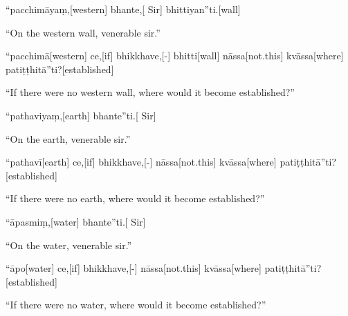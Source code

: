 \begin{samepage}
\begingl[glneveryline={\PaliGlossA,\PaliGlossB}]
“pacchimāyaṃ,[western] bhante,[ Sir] bhittiyan”ti.[wall]
\endgl
\nopagebreak
\linespread{0.5}
\begin{spacin}{0.2}
{\PaliGlossFT “On the western wall, venerable sir.”}
\end{spacin}
\vskip 12pt
\end{samepage}
\begin{samepage}
\begingl[glneveryline={\PaliGlossA,\PaliGlossB}]
“pacchimā[western] ce,[if] bhikkhave,[-] bhitti[wall] nāssa[not.this] kvāssa[where] patiṭṭhitā”ti?[established]
\endgl
\nopagebreak
\linespread{0.5}
\begin{spacin}{0.2}
{\PaliGlossFT “If there were no western wall, where would it become established?”}
\end{spacin}
\vskip 12pt
\end{samepage}
\begin{samepage}
\begingl[glneveryline={\PaliGlossA,\PaliGlossB}]
“pathaviyaṃ,[earth] bhante”ti.[ Sir]
\endgl
\nopagebreak
\linespread{0.5}
\begin{spacin}{0.2}
{\PaliGlossFT “On the earth, venerable sir.”}
\end{spacin}
\vskip 12pt
\end{samepage}
\begin{samepage}
\begingl[glneveryline={\PaliGlossA,\PaliGlossB}]
“pathavī[earth] ce,[if] bhikkhave,[-] nāssa[not.this] kvāssa[where] patiṭṭhitā”ti?[established]
\endgl
\nopagebreak
\linespread{0.5}
\begin{spacin}{0.2}
{\PaliGlossFT “If there were no earth, where would it become established?”}
\end{spacin}
\vskip 12pt
\end{samepage}
\begin{samepage}
\begingl[glneveryline={\PaliGlossA,\PaliGlossB}]
“āpasmiṃ,[water] bhante”ti.[ Sir]
\endgl
\nopagebreak
\linespread{0.5}
\begin{spacin}{0.2}
{\PaliGlossFT “On the water, venerable sir.”}
\end{spacin}
\vskip 12pt
\end{samepage}
\begin{samepage}
\begingl[glneveryline={\PaliGlossA,\PaliGlossB}]
“āpo[water] ce,[if] bhikkhave,[-] nāssa[not.this] kvāssa[where] patiṭṭhitā”ti?[established]
\endgl
\nopagebreak
\linespread{0.5}
\begin{spacin}{0.2}
{\PaliGlossFT “If there were no water, where would it become established?”}
\end{spacin}
\vskip 12pt
\end{samepage}
